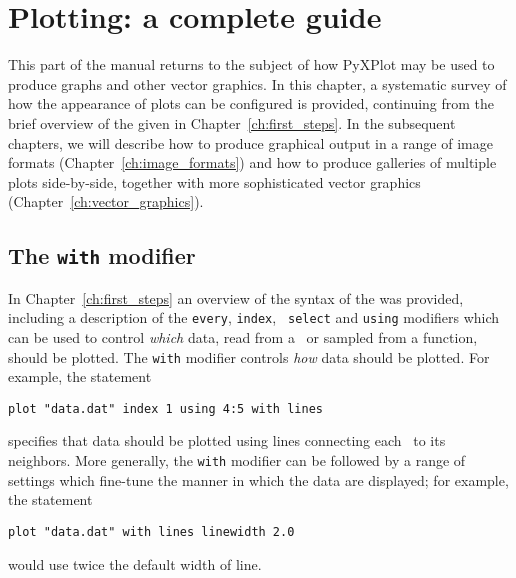 %
%
%
%
%



\chapter{Plotting: a complete guide}
\label{ch:plotting}

This part of the manual returns to the subject of how PyXPlot may be used to
produce graphs and other vector graphics. In this chapter, a systematic survey
of how the appearance of plots can be configured is provided, continuing from
the brief overview of the  given in Chapter~\ref{ch:first_steps}.
In the subsequent chapters, we will describe how to produce graphical output in
a range of image formats (Chapter~\ref{ch:image_formats}) and how to produce
galleries of multiple plots side-by-side, together with more sophisticated
vector graphics (Chapter~\ref{ch:vector_graphics}).

\section{The {\tt with} modifier}
\label{sec:with_modifier}

In Chapter~\ref{ch:first_steps} an overview of the syntax of the 
was provided, including a description of the {\tt every}, {\tt index}, {\tt
select} and {\tt using} modifiers which can be used to control {\it which}
data, read from a \datafile\ or sampled from a function, should be plotted. The
{\tt with} modifier controls {\it how} data should be plotted. For example, the
statement
\begin{verbatim}
plot "data.dat" index 1 using 4:5 with lines
\end{verbatim}
specifies that data should be plotted using lines connecting each \datapoint\ to
its neighbors. More generally, the {\tt with} modifier can be followed by a
range of settings which fine-tune the manner in which the data are displayed;
for example, the statement
\begin{verbatim}
plot "data.dat" with lines linewidth 2.0
\end{verbatim}
would use twice the default width of line.

